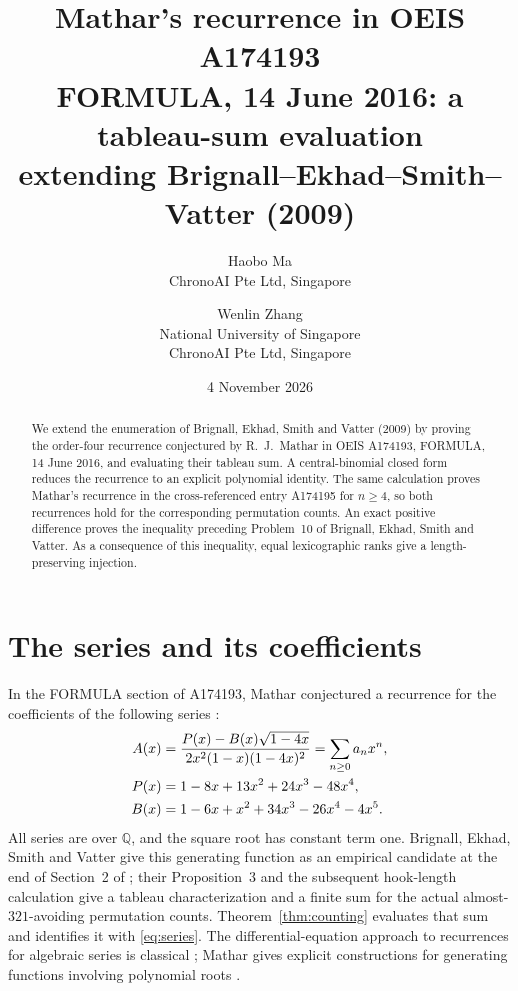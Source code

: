 \documentclass[10pt]{article}
\title{Mathar's recurrence in OEIS A174193\\
\large FORMULA, 14 June 2016: a tableau-sum evaluation\\
extending Brignall--Ekhad--Smith--Vatter (2009)}
\author{Haobo Ma\\\small ChronoAI Pte Ltd, Singapore
\and Wenlin Zhang\\\small National University of Singapore\\\small ChronoAI Pte Ltd, Singapore}
\date{4 November 2026}
\begin{document}
\maketitle
\begin{abstract}
We extend the enumeration of Brignall, Ekhad, Smith and Vatter (2009)
by proving the order-four recurrence conjectured by R.\ J.\ Mathar in
OEIS A174193, FORMULA, 14 June 2016, and evaluating their tableau sum.
A central-binomial closed form reduces the
recurrence to an explicit polynomial identity. The same calculation proves
Mathar's recurrence in the cross-referenced entry A174195 for $n\geq4$,
so both recurrences hold for the corresponding permutation counts.
An exact positive difference proves the inequality preceding Problem~10
of Brignall, Ekhad, Smith and Vatter. As a consequence of this inequality,
equal lexicographic ranks give a length-preserving injection.
\end{abstract}

\section{The series and its coefficients}
In the FORMULA section of A174193, Mathar conjectured a recurrence for the
coefficients of the following series \cite{oeis193}:
\begin{align}
 A(x)&=\frac{P(x)-B(x)\sqrt{1-4x}}{2x^2(1-x)(1-4x)^2}
       =\sum_{n\geq0}a_nx^n,\label{eq:series}\\
 P(x)&=1-8x+13x^2+24x^3-48x^4,\notag\\
 B(x)&=1-6x+x^2+34x^3-26x^4-4x^5.\notag
\end{align}
All series are over $\mathbb Q$, and the square root has constant term one.
Brignall, Ekhad, Smith and Vatter give this generating function as an
empirical candidate at the end of Section~2 of \cite{almost}; their
Proposition~3 and the subsequent hook-length calculation give a tableau
characterization and a finite sum for the actual almost-$321$-avoiding permutation counts.
Theorem~\ref{thm:counting} evaluates that sum and identifies it with
\eqref{eq:series}.
The differential-equation approach to recurrences for algebraic series is
classical \cite[Theorems~1.5 and 2.1]{stanley}; Mathar gives explicit constructions
for generating functions involving polynomial roots \cite{mathar}.
\end{document}
